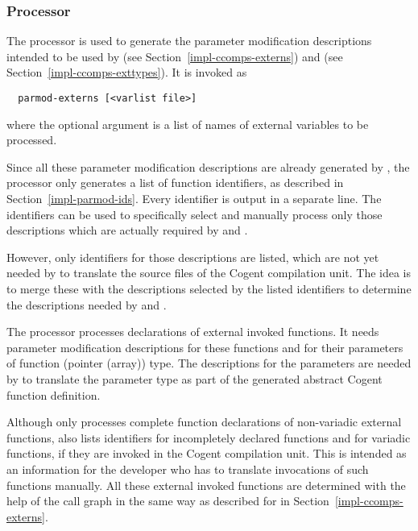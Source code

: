 \subsubsection{Processor }

The processor  is used to generate the parameter modification descriptions intended
to be used by  (see Section~\ref{impl-ccomps-externs}) and  
(see Section~\ref{impl-ccomps-exttypes}). It is invoked as
\begin{verbatim}
  parmod-externs [<varlist file>]
\end{verbatim}
where the optional argument is a list of names of external variables to be processed.

Since all these parameter modification descriptions are already
generated by , the processor only generates a list of function identifiers, as described in 
Section~\ref{impl-parmod-ids}. Every identifier is output in a separate line. The identifiers can be used
to specifically select and manually process only those descriptions which are actually required by
 and . 

However, only identifiers for those descriptions are listed,
which are not yet needed by  to translate the source files of the Cogent compilation unit.
The idea is to merge these with the descriptions selected by the listed identifiers to determine the 
descriptions needed by  and .

The processor  processes declarations of external invoked functions. It needs parameter
modification descriptions for these functions and for their parameters of function (pointer (array)) type.
The descriptions for the parameters are needed by  to translate the parameter type as part of the 
generated abstract Cogent function definition. 

Although  only processes complete function declarations of non-variadic external functions, 
 also lists identifiers for incompletely declared functions and for variadic functions,
if they are invoked in the Cogent compilation unit. This is intended as an 
information for the developer who has to translate invocations of such functions manually. All these
external invoked functions are determined with the help of the call graph in the same way as described for 
 in Section~\ref{impl-ccomps-externs}.


